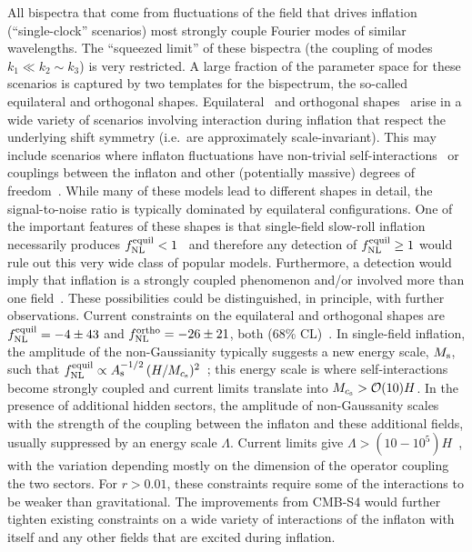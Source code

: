 All bispectra that come from fluctuations of the field that drives inflation (``single-clock'' scenarios) most strongly couple Fourier modes of similar wavelengths. The ``squeezed limit'' of these bispectra (the coupling of modes $k_1\ll k_2\sim k_3$) is very restricted. A large fraction of the parameter space for these scenarios is captured by two templates for the bispectrum, the so-called equilateral and orthogonal shapes.  Equilateral~\cite{Babich:2004gb} and orthogonal shapes~\cite{Senatore:2009gt} arise in a wide variety of scenarios involving interaction during inflation that respect the underlying shift symmetry (i.e.\ are approximately scale-invariant).  This may include scenarios where inflaton fluctuations have non-trivial self-interactions~\cite{Silverstein:2003hf,ArkaniHamed:2003uz,Alishahiha:2004eh,Chen:2006nt,Cheung:2007st,Senatore:2009gt} or couplings between the inflaton and other (potentially massive) degrees of freedom~\cite{Chen:2009zp,Tolley:2009fg, Cremonini:2010ua, Achucarro:2010da,Baumann:2011nk,Barnaby:2011pe,Arkani-Hamed:2015bza}.  While many of these models lead to different shapes in detail, the signal-to-noise ratio is typically dominated by equilateral configurations.  One of the important features of these shapes is that single-field slow-roll inflation necessarily produces $f_{\rm NL}^{\rm equil} < 1$~\cite{Creminelli:2003iq} and therefore any detection of $f_{\rm NL}^{\rm equil} \geq 1$ would rule out this very wide class of popular models.  Furthermore, a detection would imply that inflation is a strongly coupled phenomenon and/or involved more than one field~\cite{Baumann:2014cja,Alvarez:2014vva,Baumann:2015nta}.  These possibilities could be distinguished, in principle, with further observations.  Current constraints on the equilateral and orthogonal shapes are $f_{\rm NL}^{\rm equil} = -4 \pm 43$ and $f_{\rm NL}^{\rm ortho} = -26 \pm 21$, both (68\% CL)~\cite{Ade:2015ava}. In single-field inflation, the amplitude of the non-Gaussianity typically suggests a new energy scale, $M_{\rm s}$, such that $f_{\rm NL}^{\rm equil} \propto A_{\rm s}^{-1/2} \, (H/M_{c_{\rm s}})^2$~\cite{Cheung:2007st,Baumann:2011su}; this energy scale is where self-interactions become strongly coupled and current limits translate into $M_{c_{\rm s}}>\mathcal{O}(10)H$.  In the presence of additional hidden sectors, the amplitude of non-Gaussanity scales with the strength of the coupling between the inflaton and these additional fields, usually suppressed by an energy scale $\Lambda$.  Current limits give $\Lambda  > (10{-}10^{5}) H$~\cite{Green:2013rd,Assassi:2013gxa}, with the variation depending mostly on the dimension of the operator coupling the two sectors.  For $r > 0.01$, these constraints require some of the interactions to be weaker than gravitational.  The improvements from CMB-S4 would further tighten existing constraints on a wide variety of interactions of the inflaton with itself and any other fields that are excited during inflation.    

